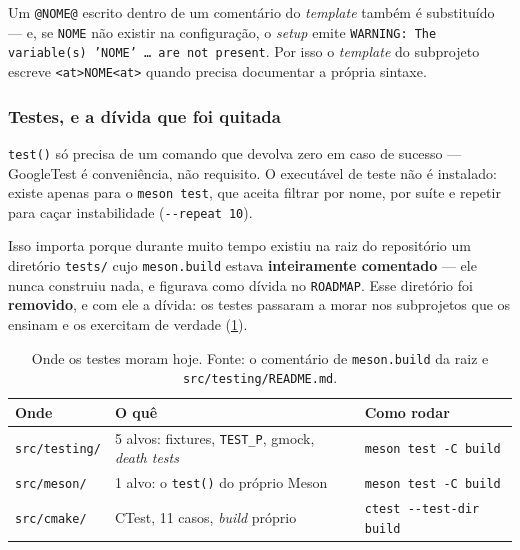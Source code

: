 \begin{armadilha}
Um \texttt{@NOME@} escrito dentro de um comentário do \emph{template} também é
substituído --- e, se \texttt{NOME} não existir na configuração, o \emph{setup}
emite \texttt{WARNING: The variable(s) 'NOME' … are not present}. Por isso o
\emph{template} do subprojeto escreve \texttt{<at>NOME<at>} quando precisa
documentar a própria sintaxe.
\end{armadilha}

\subsubsection{Testes, e a dívida que foi quitada}

\texttt{test()} só precisa de um comando que devolva zero em caso de sucesso ---
GoogleTest é conveniência, não requisito. O executável de teste não é instalado:
existe apenas para o \texttt{meson test}, que aceita filtrar por nome, por suíte
e repetir para caçar instabilidade (\texttt{-{}-repeat 10}).

Isso importa porque durante muito tempo existiu na raiz do repositório um
diretório \texttt{tests/} cujo \texttt{meson.build} estava \textbf{inteiramente
comentado} --- ele nunca construiu nada, e figurava como dívida no
\texttt{ROADMAP}. Esse diretório foi \textbf{removido}, e com ele a dívida: os
testes passaram a morar nos subprojetos que os ensinam e os exercitam de
verdade (\cref{tab:onde-moram-testes}).

\begin{table}[htbp]
\centering
\caption{Onde os testes moram hoje. Fonte: o comentário de
         \texttt{meson.build} da raiz e \texttt{src/testing/README.md}.}
\label{tab:onde-moram-testes}
\footnotesize
\begin{tabular}{@{}lll@{}}
\toprule
\textbf{Onde} & \textbf{O quê} & \textbf{Como rodar} \\
\midrule
\texttt{src/testing/} & 5 alvos: fixtures, \texttt{TEST\_P}, gmock, \emph{death tests} & \texttt{meson test -C build} \\
\texttt{src/meson/}   & 1 alvo: o \texttt{test()} do próprio Meson                    & \texttt{meson test -C build} \\
\texttt{src/cmake/}   & CTest, 11 casos, \emph{build} próprio                         & \texttt{ctest -{}-test-dir build} \\
\bottomrule
\end{tabular}
\end{table}

